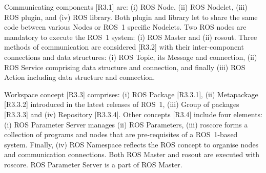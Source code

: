 \documentclass[11pt,oneside,a4paper]{article}
\begin{document}
	Communicating components [R3.1] are: (i) ROS Node, (ii) ROS Nodelet, (iii) ROS plugin, and (iv) ROS library. Both plugin and library let to share the same code between various Nodes or ROS~1 specific Nodelets. Two ROS nodes are mandatory to execute the ROS~1 system: (i) ROS Master and (ii) rosout.
%
	 Three methods of communication are considered [R3.2] with their inter-component connections and data structures: (i) ROS Topic, its Message and connection, (ii) ROS Service comprising data structure and connection, and finally (iii) ROS Action including data structure and connection.
	
	Workspace concept [R3.3] comprises: (i) ROS Package [R3.3.1], (ii) Metapackage [R3.3.2] introduced in the latest releases of ROS~1, (iii) Group of packages [R3.3.3] and (iv) Repository [R3.3.4].
%	
	Other concepts [R3.4] include four elements: (i) ROS Parameter Server manages (ii) ROS Parameters, (iii) roscore forms a collection of programs and nodes that are pre-requisites of a ROS~1-based system. Finally, (iv) ROS Namespace reflects the ROS concept to organise nodes and communication connections. Both ROS Master and rosout are executed with roscore. ROS Parameter Server is a part of ROS Master.
%	
\end{document}
